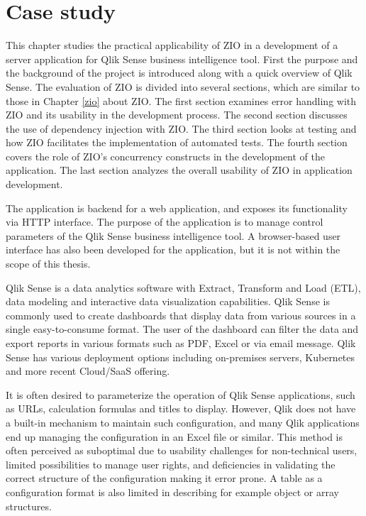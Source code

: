 \chapter{Case study}
This chapter studies the practical applicability of ZIO in a development of a server application for Qlik Sense business intelligence tool. First the purpose and the background of the project is introduced along with a quick overview of Qlik Sense. The evaluation of ZIO is divided into several sections, which are similar to those in Chapter \ref{zio} about ZIO. The first section examines error handling with ZIO and its usability in the development process. The second section discusses the use of dependency injection with ZIO. The third section looks at testing and how ZIO facilitates the implementation of automated tests. The fourth section covers the role of ZIO's concurrency constructs in the development of the application. The last section analyzes the overall usability of ZIO in application development.

The application is backend for a web application, and exposes its functionality via HTTP interface. The purpose of the application is to manage control parameters of the Qlik Sense business intelligence tool. A browser-based user interface has also been developed for the application, but it is not within the scope of this thesis.

Qlik Sense is a data analytics software with Extract, Transform and Load (ETL), data modeling and interactive data visualization capabilities. Qlik Sense is commonly used to create dashboards that display data from various sources in a single easy-to-consume format. The user of the dashboard can filter the data and export reports in various formats such as PDF, Excel or via email message. Qlik Sense has various deployment options including on-premises servers, Kubernetes and more recent Cloud/SaaS offering.

It is often desired to parameterize the operation of Qlik Sense applications, such as URLs, calculation formulas and titles to display. However, Qlik does not have a built-in mechanism to maintain such configuration, and many Qlik applications end up managing the configuration in an Excel file or similar. This method is often perceived as suboptimal due to usability challenges for non-technical users, limited possibilities to manage user rights, and deficiencies in validating the correct structure of the configuration making it error prone. A table as a configuration format is also limited in describing for example object or array structures.

